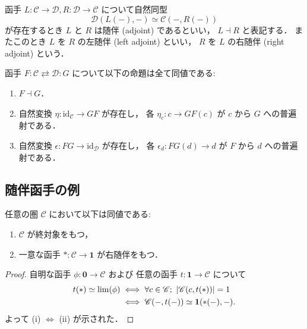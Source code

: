 \documentclass[titlepage]{ltjsreport}
\newcommand{\cat}[1]{\mathscr{#1}}
\newcommand{\obj}[1]{\lowercase{#1}}
\newcommand{\objs}[1]{#1}
\newcommand{\mrp}[3]{{#1}:{#2}\to{#3}}
\newcommand{\mrps}[3]{#1(#2,#3)}
\newcommand{\id}[1]{\mathrm{id}_{#1}}
\begin{document}
\begin{definition}[随伴]
  \def\C{\cat{C}}%
  \def\D{\cat{D}}%
  \def\L{L}%
  \def\R{R}%
  函手 $\mrp{\L}{\C}{\D},\mrp{\R}{\D}{\C}$ について自然同型
  \begin{equation}
    \mrps{\D}{\L(-)}{-}\simeq\mrps{\C}{-}{\R(-)}
  \end{equation}
  が存在するとき $\L$ と $\R$ は随伴 (adjoint) であるといい，
  $\L\dashv\R$ と表記する．
  またこのとき $\L$ を $\R$ の左随伴 (left adjoint) といい，
  $\R$ を $\L$ の右随伴 (right adjoint) という．
\end{definition}

\begin{theorem}[随伴函手の並列定義]\label{thm:adjoint-functor-definitions}
  函手 $F:\cat{C}\rightleftarrows\cat{D}:G$ について以下の命題は全て同値である:
  \begin{enumerate}
    \item $F\dashv G$．
    \item 自然変換 $\eta:\id{\cat{C}}\to GF$ が存在し，
          各 $\eta_c:c\to GF(c)$ が $c$ から $G$ への普遍射である．
    \item 自然変換 $\epsilon:FG\to\id{\cat{D}}$ が存在し，
          各 $\epsilon_d:FG(d)\to d$ が $F$ から $d$ への普遍射である．
  \end{enumerate}
\end{theorem}

\subsection{随伴函手の例}

{
  \def\C{\cat{C}}%
  \begin{theorem}[終対象]
    任意の圏 $\C$ において以下は同値である:
    \begin{enumerate}[label=(\roman*)] %
      \item $\C$ が終対象をもつ，
      \item 一意な函手 $*:\C\to\mathbf{1}$ が右随伴をもつ．
    \end{enumerate}
  \end{theorem}
  \begin{proof}
    \def\c{\obj{c}}%
    自明な函手 $\mrp{\phi}{\mathbf{0}}{\C}$ および
    任意の函手 $t:\mathbf{1}\to\C$ について
    \begin{align} %
      t(*)\simeq\lim(\phi)
       & \iff\forall\c\in\objs{\C};
      \ |\mrps{\C}{c}{t(*)}|=1                                   \\
       & \iff\mrps{\C}{-}{t(-)}\simeq\mrps{\mathbf{1}}{*(-)}{-}.
    \end{align}
    よって (i) $\Leftrightarrow$ (ii) が示された．
  \end{proof}
}
\end{document}
